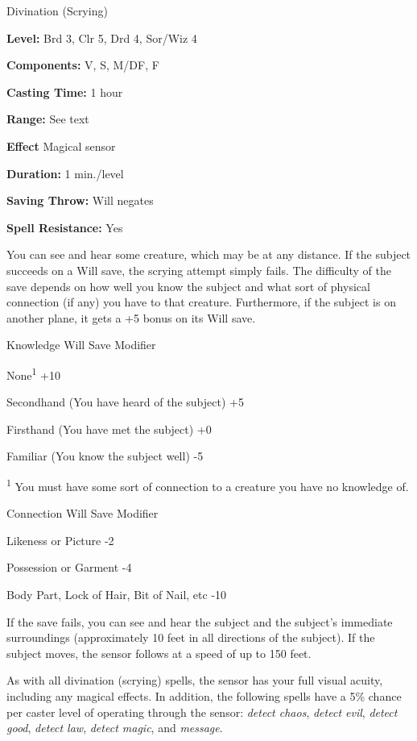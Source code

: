 
Divination (Scrying)

\textbf{Level:} Brd 3, Clr 5, Drd 4, Sor/Wiz 4

\textbf{Components:} V, S, M/DF, F

\textbf{Casting Time:} 1 hour

\textbf{Range:} See text

\textbf{Effect} Magical sensor

\textbf{Duration:} 1 min./level

\textbf{Saving Throw:} Will negates

\textbf{Spell Resistance:} Yes

You can see and hear some creature, which may be at any distance. If the subject 
succeeds on a Will save, the scrying attempt simply fails. The difficulty of the 
save depends on how well you know the subject and what sort of physical connection 
(if any) you have to that creature. Furthermore, if the subject is on another plane, 
it gets a +5 bonus on its Will save.

\begin{description*}
\item[Knowledge] Will Save Modifier
\item[None\textsuperscript{1}] +10
\item[Secondhand (You have heard of the subject)] +5
\item[Firsthand (You have met the subject)] +0
\item[Familiar (You know the subject well)] -5
\end{description*}
\textsuperscript{1} You must have some sort of connection to a creature you have no knowledge of.

\begin{description*}
\item[Connection] Will Save Modifier
\item[Likeness or Picture] -2
\item[Possession or Garment] -4
\item[Body Part, Lock of Hair, Bit of Nail, etc] -10
\end{description*}

If the save fails, you can see and hear the subject and the subject's immediate 
surroundings (approximately 10 feet in all directions of the subject). If the subject 
moves, the sensor follows at a speed of up to 150 feet.

As with all divination (scrying) spells, the sensor has your full visual acuity, 
including any magical effects. In addition, the following spells have a 5\% chance 
per caster level of operating through the sensor: \textit{detect chaos}, \textit{detect 
evil}, \textit{detect good}, \textit{detect law}, \textit{detect magic}, and \textit{message}.

